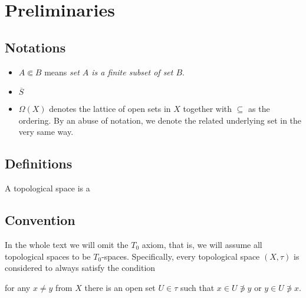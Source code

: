 \chapter*{Preliminaries}

\section*{Notations}

\begin{itemize}
\item $A \Subset B$ means {\sl set $A$ is a finite subset of set $B$\/}.
\item $\overline{S}$ 
\item $\Omega(X)$ denotes the lattice of open sets in $X$ together with
$\subseteq$ as the ordering. 
By an abuse of notation, we denote the related underlying set in the very same
way.
\end{itemize}

\section*{Definitions}

A topological space is a

\section*{Convention}

In the whole text we will omit the $T_0$ axiom, that is, we will assume all
topological spaces to be $T_0$-spaces.
Specifically, every topological space $(X, \tau)$ is considered to always
satisfy the condition
\begin{center}
  for any $x \ne y$ from $X$ there is an open set $U \in \tau$ such that $x \in U
  \not\owns y$ or $y \in U \not\owns x$.
\end{center}
